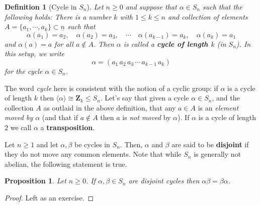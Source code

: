 \documentclass[12pt]{article}
\numberwithin{equation}{subsection}
\newtheorem{prop}[subsection]{Proposition}
\newtheorem{defn}[subsection]{Definition}
\theoremstyle{note}
\begin{document}
\begin{defn}[Cycle in $S_n$]
	Let $n\geq 0$ and suppose that $\alpha\in S_n$ such that the following holds: There is a number $k$ with $1\leq k\leq n$ and collection of elements $A=\{a_1,\cdots,a_k\}\subset \underline{n}$ such that \[ \alpha(a_1)=a_2, \quad \alpha(a_2)=a_3, \quad \cdots \quad \alpha(a_{k-1})=a_k, \quad \alpha(a_k)=a_1\] and $\alpha(a)=a$ for all $a\notin A$. Then $\alpha$ is called a \textbf{cycle of length $k$} (in $S_n$). In this setup, we write \begin{equation} \alpha=(a_1\, a_2\, a_3\,\cdots \, a_{k-1}\, a_k)\end{equation} for the cycle $\alpha \in S_n$. 

\end{defn}

The word \textit{cycle} here is consistent with the notion of a cyclic group: if $\alpha$ is a cycle of length $k$ then $\langle \alpha\rangle \cong \mathbf{Z}_k\leq S_n$. Let's say that given a cycle $\alpha\in S_n$, and the collection $A$ as outlaid in the above definition, that any $a\in A$ is an \textit{element moved by $\alpha$} (and that if $a\notin A$ then $a$ is \textit{not moved} by $\alpha$). If $\alpha$ is a cycle of length $2$ we call $\alpha$ a \textbf{transposition}.

Let $n\geq 1$ and let $\alpha, \beta$ be cycles in $S_n$. Then, $\alpha$ and $\beta$ are said to be \textbf{disjoint} if they do not move any common elements. Note that while $S_n$ is generally not abelian, the following statement is true.

\begin{prop} \label{disjoint-cycles-commute}
	Let $n\geq 0$. If $\alpha,\beta \in S_n$ are disjoint cycles then $\alpha\beta=\beta\alpha$.
\end{prop} 

\begin{proof}
	Left as an exercise.
\end{proof}
\end{document}
